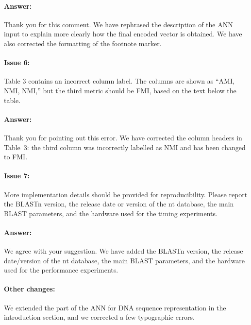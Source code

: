 \documentclass{article}
\begin{document}
\paragraph{Answer:}
Thank you for this comment. We have rephrased the description of the ANN input to explain more clearly how the final encoded vector is obtained.
We have also corrected the formatting of the footnote marker.


\paragraph{Issue 6:}
\begin{displayquote}
Table 3 contains an incorrect column label. The columns are shown as “AMI, NMI, NMI,” but the third metric should be FMI, based on the text below the table.
\end{displayquote}

\paragraph{Answer:}
Thank you for pointing out this error. We have corrected the column headers in Table~3: the third column was incorrectly labelled as NMI and has been changed to FMI.


\paragraph{Issue 7:}
\begin{displayquote}
More implementation details should be provided for reproducibility. Please report the BLASTn version, the release date or version of the nt database, the main BLAST parameters, and the hardware used for the timing experiments. 
\end{displayquote}

\paragraph{Answer:}
We agree with your suggestion. We have added the BLASTn version, the release date/version of the nt database, the main BLAST parameters, and the hardware used for the performance experiments.


\paragraph{Other changes:}
We extended the part of the ANN for DNA sequence representation in the introduction section, and we corrected a few typographic errors.
\end{document}
